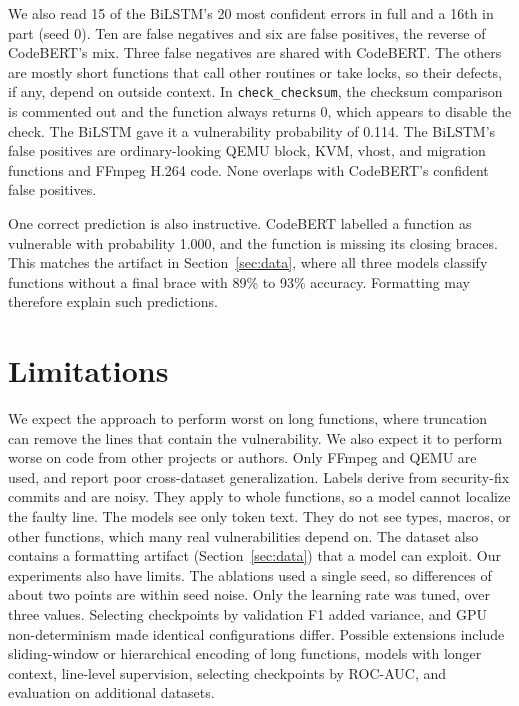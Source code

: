 \documentclass{article}
\begin{document}
We also read 15 of the BiLSTM's 20 most confident errors in full and a 16th in part (seed 0). Ten are false negatives and six are false positives, the reverse of CodeBERT's mix. Three false negatives are shared with CodeBERT. The others are mostly short functions that call other routines or take locks, so their defects, if any, depend on outside context. In \texttt{check\_checksum}, the checksum comparison is commented out and the function always returns 0, which appears to disable the check. The BiLSTM gave it a vulnerability probability of 0.114.
The BiLSTM's false positives are ordinary-looking QEMU block, KVM, vhost, and migration functions and FFmpeg H.264 code. None overlaps with CodeBERT's confident false positives.

One correct prediction is also instructive. CodeBERT labelled a function as vulnerable with probability 1.000, and the function is missing its closing braces. This matches the artifact in Section~\ref{sec:data}, where all three models classify functions without a final brace with 89\% to 93\% accuracy. Formatting may therefore explain such predictions.

\section{Limitations}

We expect the approach to perform worst on long functions, where truncation can remove the lines that contain the vulnerability. We also expect it to perform worse on code from other projects or authors. Only FFmpeg and QEMU are used, and \citet{labtoreality2025} report poor cross-dataset generalization.
Labels derive from security-fix commits and are noisy. They apply to whole functions, so a model cannot localize the faulty line. The models see only token text. They do not see types, macros, or other functions, which many real vulnerabilities depend on. The dataset also contains a formatting artifact (Section~\ref{sec:data}) that a model can exploit.
Our experiments also have limits. The ablations used a single seed, so differences of about two points are within seed noise. Only the learning rate was tuned, over three values. Selecting checkpoints by validation F1 added variance, and GPU non-determinism made identical configurations differ.
Possible extensions include sliding-window or hierarchical encoding of long functions, models with longer context, line-level supervision, selecting checkpoints by ROC-AUC, and evaluation on additional datasets.
\end{document}
